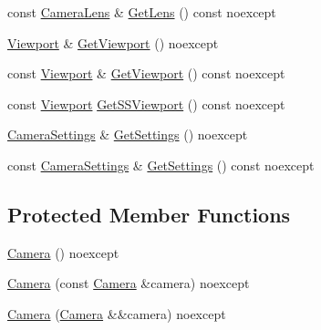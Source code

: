 \begin{DoxyCompactItemize}
\item 
const \hyperlink{classmage_1_1_camera_lens}{Camera\+Lens} \& \hyperlink{classmage_1_1_camera_ac2529ae81deabfbfed8f96cbf5b778eb}{Get\+Lens} () const noexcept
\item 
\hyperlink{classmage_1_1_viewport}{Viewport} \& \hyperlink{classmage_1_1_camera_a73deec0aefd507ec97da36069917f97c}{Get\+Viewport} () noexcept
\item 
const \hyperlink{classmage_1_1_viewport}{Viewport} \& \hyperlink{classmage_1_1_camera_afe08e4f43e57608f8bd45f3fefc89d47}{Get\+Viewport} () const noexcept
\item 
const \hyperlink{classmage_1_1_viewport}{Viewport} \hyperlink{classmage_1_1_camera_aa82c733bd7c71518fa4c0b189f87277f}{Get\+S\+S\+Viewport} () const noexcept
\item 
\hyperlink{classmage_1_1_camera_settings}{Camera\+Settings} \& \hyperlink{classmage_1_1_camera_af4077967b2b676bc66226fd7a5d15220}{Get\+Settings} () noexcept
\item 
const \hyperlink{classmage_1_1_camera_settings}{Camera\+Settings} \& \hyperlink{classmage_1_1_camera_a0174b0d44d749a678acb388b4a60b8c9}{Get\+Settings} () const noexcept
\end{DoxyCompactItemize}
\subsection*{Protected Member Functions}
\begin{DoxyCompactItemize}
\item 
\hyperlink{classmage_1_1_camera_a812001953d821fd23bb9509e5a649508}{Camera} () noexcept
\item 
\hyperlink{classmage_1_1_camera_a13f576c2ea50712145e43501bf3cae9c}{Camera} (const \hyperlink{classmage_1_1_camera}{Camera} \&camera) noexcept
\item 
\hyperlink{classmage_1_1_camera_a858d43c7b166ef580c7d971719045371}{Camera} (\hyperlink{classmage_1_1_camera}{Camera} \&\&camera) noexcept
\end{DoxyCompactItemize}
